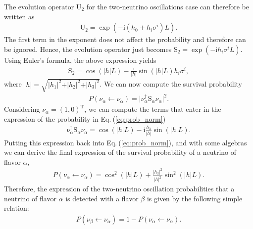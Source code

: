 \documentclass[twocolumn,secnumarabic,amssymb, nobibnotes, aps, prd,10pt]{revtex4-1}
\newcommand{\Eq}[1]{Eq.$\:$(\ref{#1})}
\begin{document}
The evolution operator $\mathrm{U}_2$ for the two-neutrino oscillations case can
therefore be written as
\begin{align}
\mathrm{U}_2 = \exp \left( - \mathrm{i} (h_0 + h_i \sigma^i) L \right).
\end{align}
The first term in the exponent does not affect the probability and therefore can be 
ignored. Hence, the evolution operator just becomes $\mathrm{S}_2 = \exp (- \mathrm{i}
h_i \sigma^i L)$. Using Euler's formula, the above expression yields
\begin{align}
\mathrm{S}_2 = \cos (\vert h \vert L) -  \frac{\mathrm{i}}
{\vert h \vert} \sin (\vert h \vert L) h_i \sigma^i ,
\end{align}
where $\vert h \vert = \sqrt{ \vert h_1 \vert^2 + \vert h_2 \vert^2 +
\vert h_3 \vert^2}$. We can now compute the survival probability 
\begin{align}
P (\nu_\alpha \longleftarrow \nu_\alpha) = \vert \nu_\alpha^\dagger \mathrm{S}_\alpha
\nu_\alpha \vert^2 .
\label{eq:prob_norm}
\end{align} 
Considering $\nu_\alpha = (1,0)^\mathrm{T}$, we can compute the terms that enter in the
expression of the probability in \Eq{eq:prob_norm}
\begin{align}
\nu_\alpha^\dagger \mathrm{S}_\alpha \nu_\alpha = \cos (\vert h \vert L) - \mathrm{i}
\frac{h_3}{\vert h \vert} \sin (\vert h \vert L).
\end{align}
Putting this expression back into \Eq{eq:prob_norm}, and with some algebras we can
derive the final expression of the survival probability of a neutrino of flavor $\alpha$,
\begin{align}
P (\nu_\alpha \longleftarrow \nu_\alpha) =  \cos^2 (\vert h \vert L) +
\frac{\vert h_3 \vert^2 }{\vert h \vert^2} \sin^2 (\vert h \vert L).
\end{align}
Therefore, the expression of the two-neutrino oscillation probabilities that a neutrino
of flavor $\alpha$ is detected with a flavor $\beta$ is given by the following simple
relation:
\begin{align}
P (\nu_\beta \longleftarrow \nu_\alpha) = 1 - P (\nu_\alpha \longleftarrow \nu_\alpha).
\end{align}
\end{document}
